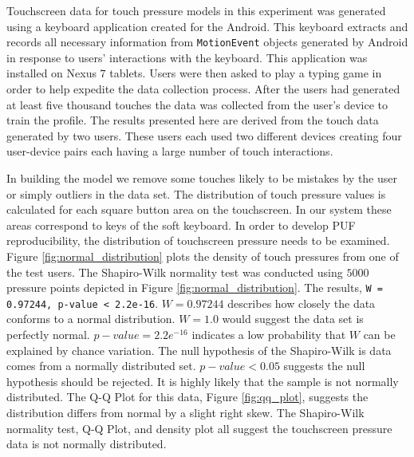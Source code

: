 Touchscreen data for touch pressure models in this experiment 
was generated using a keyboard application created for the Android. 
This keyboard extracts and records all necessary information 
from {\tt MotionEvent} objects generated by Android in response to
users' interactions with the keyboard.
This application was installed on Nexus $7$ tablets.
Users were then asked to play a typing game 
in order to help expedite the data collection process.
After the users had generated at least five thousand touches the data was collected from the user's device to train the profile.
%
The results presented here are derived from the touch data generated by two users.
These users each used two different devices creating four user-device pairs
each having a large number of touch interactions.

In building the model we remove some touches likely to be mistakes by the user or simply outliers in the data set.
%
The distribution of touch pressure values is 
calculated for each square button area on the touchscreen. 
In our system these areas correspond to keys of the soft keyboard.
%
In order to develop PUF reproducibility,
the distribution of touchscreen pressure needs to be examined.
%
Figure \ref{fig:normal_distribution} plots the density of 
touch pressures from one of the test users.
%
The Shapiro-Wilk normality test \cite{shapiro1965analysis} was conducted
using $5000$ pressure points depicted in
Figure \ref{fig:normal_distribution}.
%
The results, {\tt W = 0.97244, p-value < 2.2e-16}.
$W=0.97244$ describes how closely the data conforms to a normal distribution.
$W=1.0$ would suggest the data set is perfectly normal.
$p-value=2.2e^{-16}$ indicates a low probability that
$W$ can be explained by chance variation.
%
The null hypothesis of the Shapiro-Wilk is
data comes from a normally distributed set.
$p-value<0.05$ suggests the null hypothesis should be rejected.
It is highly likely that the sample is not normally distributed.
%
%
The Q-Q Plot for this data, Figure \ref{fig:qq_plot},
suggests the distribution differs from normal
by a slight right skew.
%
The Shapiro-Wilk normality test,
Q-Q Plot, 
and density plot
all suggest the touchscreen pressure data is not normally distributed.

